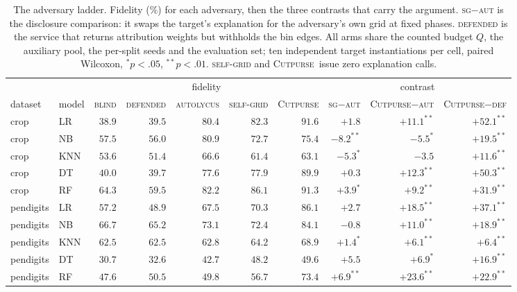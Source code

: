 \documentclass[sigconf,anonymous,review]{acmart}
\newcommand{\sys}{\textsc{Cutpurse}}
\begin{document}
\begin{table}[t]
\centering
\caption{The adversary ladder. Fidelity (\%) for each adversary, then the three contrasts that carry
the argument. \textsc{sg}$-$\textsc{aut} is the disclosure comparison: it swaps the target's
explanation for the adversary's own grid at fixed phases. \textsc{defended} is the service that returns attribution weights but withholds the bin
edges. All arms share the counted budget $Q$, the auxiliary pool, the per-split seeds and the
evaluation set; ten independent target instantiations per cell, paired Wilcoxon, $^{*}p{<}.05$,
$^{**}p{<}.01$. \textsc{self-grid} and \sys\ issue zero explanation calls.}
\label{tab:ladder}
\begin{tabular}{llrrrrrrrr}
\toprule
& & \multicolumn{5}{c}{fidelity} & \multicolumn{3}{c}{contrast} \\
\cmidrule(lr){3-7}\cmidrule(lr){8-10}
dataset & model & \textsc{blind} & \textsc{defended} & \textsc{autolycus} & \textsc{self-grid}
& \sys & \textsc{sg}$-$\textsc{aut} & \sys$-$\textsc{aut} & \sys$-$\textsc{def} \\
\midrule
crop       & LR   & $38.9$ & $39.5$ & $80.4$ & $82.3$ & $91.6$ & $+1.8$ & $+11.1^{**}$ & $+52.1^{**}$ \\
crop       & NB   & $57.5$ & $56.0$ & $80.9$ & $72.7$ & $75.4$ & $-8.2^{**}$ & $-5.5^{*}$ & $+19.5^{**}$ \\
crop       & KNN  & $53.6$ & $51.4$ & $66.6$ & $61.4$ & $63.1$ & $-5.3^{*}$ & $-3.5$ & $+11.6^{**}$ \\
crop       & DT   & $40.0$ & $39.7$ & $77.6$ & $77.9$ & $89.9$ & $+0.3$ & $+12.3^{**}$ & $+50.3^{**}$ \\
crop       & RF   & $64.3$ & $59.5$ & $82.2$ & $86.1$ & $91.3$ & $+3.9^{*}$ & $+9.2^{**}$ & $+31.9^{**}$ \\
\addlinespace
pendigits  & LR   & $57.2$ & $48.9$ & $67.5$ & $70.3$ & $86.1$ & $+2.7$ & $+18.5^{**}$ & $+37.1^{**}$ \\
pendigits  & NB   & $66.7$ & $65.2$ & $73.1$ & $72.4$ & $84.1$ & $-0.8$ & $+11.0^{**}$ & $+18.9^{**}$ \\
pendigits  & KNN  & $62.5$ & $62.5$ & $62.8$ & $64.2$ & $68.9$ & $+1.4^{*}$ & $+6.1^{**}$ & $+6.4^{**}$ \\
pendigits  & DT   & $30.7$ & $32.6$ & $42.7$ & $48.2$ & $49.6$ & $+5.5$ & $+6.9^{*}$ & $+16.9^{**}$ \\
pendigits  & RF   & $47.6$ & $50.5$ & $49.8$ & $56.7$ & $73.4$ & $+6.9^{**}$ & $+23.6^{**}$ & $+22.9^{**}$ \\

\end{tabular}
\end{table}
\end{document}
